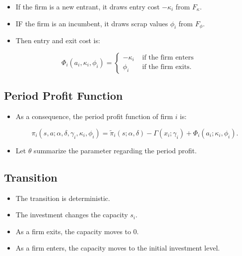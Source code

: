 \documentclass[]{book}
\providecommand{\tightlist}{%
  \setlength{\itemsep}{0pt}\setlength{\parskip}{0pt}}
\begin{document}
\begin{itemize}
\tightlist
\item
  If the firm is a new entrant, it draws entry cost \(-\kappa_i\) from
  \(F_\kappa\).
\item
  IF the firm is an incumbent, it draws scrap values \(\phi_i\) from
  \(F_\phi\).
\item
  Then entry and exit cost is:
\end{itemize}

\begin{equation}
\Phi_i(a_i, \kappa_i, \phi_i) =
\begin{cases}
- \kappa_i &\text{   if the firm enters}\\
\phi_i &\text{   if the firm exits}.
\end{cases}
\end{equation}

\subsection{Period Profit Function}\label{period-profit-function}

\begin{itemize}
\tightlist
\item
  As a consequence, the period profit function of firm \(i\) is:

  \begin{equation}
  \pi_i(s, a; \alpha, \delta, \gamma_i, \kappa_i, \phi_i) = \tilde{\pi}_i(s; \alpha, \delta) - \Gamma(x_i; \gamma_i) + \Phi_i(a_i; \kappa_i, \phi_i).
  \end{equation}
\item
  Let \(\theta\) summarize the parameter regarding the period profit.
\end{itemize}

\subsection{Transition}\label{transition}

\begin{itemize}
\tightlist
\item
  The transition is deterministic.
\item
  The investment changes the capacity \(s_i\).
\item
  As a firm exits, the capacity moves to 0.
\item
  As a firm enters, the capacity moves to the initial investment level.
\end{itemize}
\end{document}
